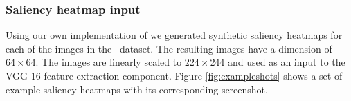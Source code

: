 \subsubsection{Saliency heatmap input}
Using our own implementation of \citet{shan2017two} we generated synthetic saliency heatmaps for each of the images in the \datasetname~dataset. The resulting images have a dimension of $64\times64$. The images are linearly scaled to $224\times244$ and used as an input to the VGG-16 feature extraction component. Figure \ref{fig:exampleshots} shows a set of example saliency heatmaps with its corresponding screenshot. 
